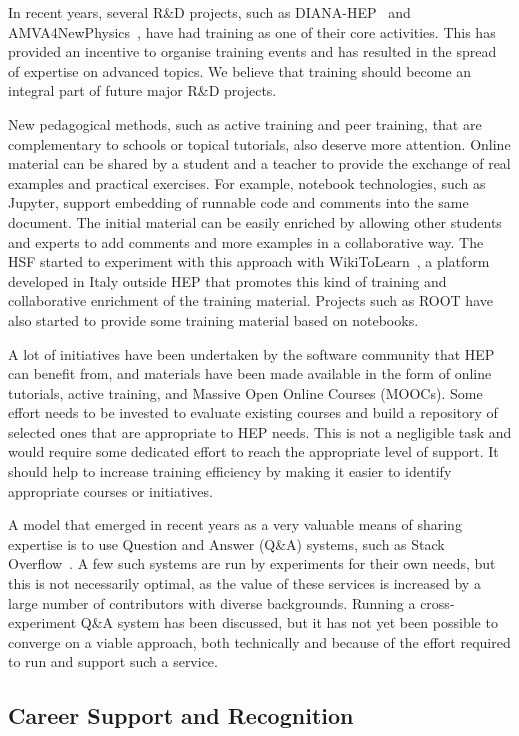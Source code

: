 In recent years, several R\&D projects, such as DIANA-HEP~\cite{DIANA-HEP} and
AMVA4\-New\-Physics~\cite{AMVA4NewPhysics}, have had training as one 
of their core activities. This
has provided an incentive to organise training events and has resulted
in the spread of expertise on advanced topics. We believe that training
should become an integral part of future major R\&D projects.

New pedagogical methods, such as active training and peer training, that
are complementary to schools or topical tutorials, also deserve more
attention. Online material can be shared by a student and a teacher to
provide the exchange of real examples and practical exercises. For
example, notebook technologies, such as Jupyter, support embedding of
runnable code and comments into the same document. The initial material
can be easily enriched by allowing other students and experts to add
comments and more examples in a collaborative way. The HSF started to
experiment with this approach with WikiToLearn~\cite{WikiToLearn}, a
platform developed in Italy outside HEP that promotes this kind of
training and collaborative enrichment of the training material. Projects
such as ROOT have also started to provide some
training material based
on notebooks.

A lot of initiatives have been undertaken by the software community that
HEP can benefit from, and materials have been made available in the form
of online tutorials, active training, and Massive Open Online Courses
(MOOCs). Some effort needs to be invested to evaluate existing courses
and build a repository of selected ones that are appropriate to HEP
needs. This is not a negligible task and would require some dedicated
effort to reach the appropriate level of support. It should help to
increase training efficiency by making it easier to identify appropriate
courses or initiatives.

A model that emerged in recent years as a very valuable means of sharing
expertise is to use Question and Answer (Q\&A) systems, such as Stack
Overflow~\cite{Stackoverflow}. A few such systems are run by experiments for their own needs,
but this is not necessarily optimal, as the value of these services is
increased by a large number of contributors with diverse backgrounds.
Running a cross-experiment Q\&A system has been discussed, but it has
not yet been possible to converge on a viable approach, both technically
and because of the effort required to run and support such a service.

\subsection{Career Support and Recognition}

